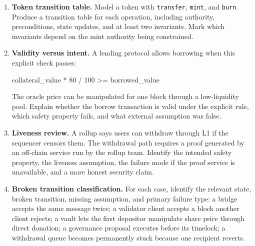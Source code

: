 \begin{enumerate}
\item \textbf{Token transition table.} Model a token with \texttt{transfer}, \texttt{mint}, and \texttt{burn}. Produce a transition table for each operation, including authority, preconditions, state updates, and at least two invariants. Mark which invariants depend on the mint authority being constrained.

\item \textbf{Validity versus intent.} A lending protocol allows borrowing when this explicit check passes:

\begin{codeblock}
collateral_value * 80 / 100 >= borrowed_value
\end{codeblock}

The oracle price can be manipulated for one block through a low-liquidity pool. Explain whether the borrow transaction is valid under the explicit rule, which safety property fails, and what external assumption was false.

\item \textbf{Liveness review.} A rollup says users can withdraw through L1 if the sequencer censors them. The withdrawal path requires a proof generated by an off-chain service run by the rollup team. Identify the intended safety property, the liveness assumption, the failure mode if the proof service is unavailable, and a more honest security claim.

\item \textbf{Broken transition classification.} For each case, identify the relevant state, broken transition, missing assumption, and primary failure type: a bridge accepts the same message twice; a validator client accepts a block another client rejects; a vault lets the first depositor manipulate share price through direct donation; a governance proposal executes before its timelock; a withdrawal queue becomes permanently stuck because one recipient reverts.
\end{enumerate}
